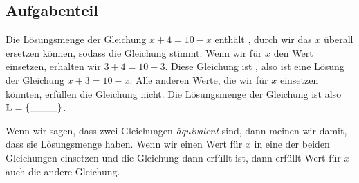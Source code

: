 \documentclass[solution]{uebungsblatt}
\begin{document}
\subsection*{Aufgabenteil}
%
\begin{exercise}
    Die Lösungsmenge der Gleichung $x+4=10-x$ enthält , durch  wir das $x$ überall ersetzen können, sodass die Gleichung stimmt. Wenn wir für $x$ den Wert  einsetzen, erhalten wir $3+4=10-3$. Diese Gleichung ist , also ist  eine Lösung der Gleichung $x+3=10-x$. Alle anderen Werte, die wir für $x$ einsetzen könnten, erfüllen die Gleichung nicht. Die Lösungsmenge der Gleichung ist also $\Solutions=\{\answerfield{1cm}{3}\}$.
\end{exercise}
\begin{exercise}
    Wenn wir sagen, dass zwei Gleichungen \emph{äquivalent} sind, dann meinen wir damit, dass sie  Lösungsmenge haben. Wenn wir einen Wert für $x$ in eine der beiden Gleichungen einsetzen und die Gleichung dann erfüllt ist, dann erfüllt  Wert für $x$ auch die andere Gleichung.
\end{exercise}
\end{document}
